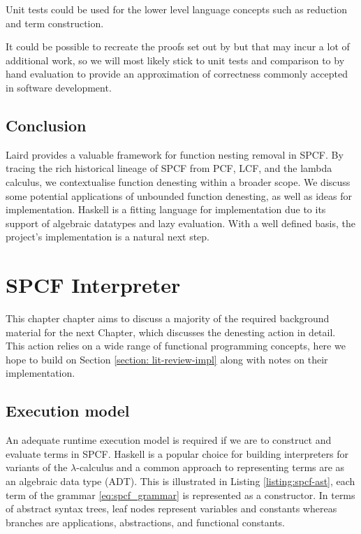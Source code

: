 \documentclass[12pt,a4paper]{report}
\theoremstyle{definition}
\theoremstyle{remark}
\begin{document}
Unit tests could be used for the lower level language concepts such as reduction and term construction.

It could be possible to recreate the proofs set out by \cite{laird_2007} but that may incur a lot of additional work, so we will most likely stick to unit tests and comparison to by hand evaluation to provide an approximation of correctness commonly accepted in software development.

\section{Conclusion}
Laird provides a valuable framework for function nesting removal in SPCF. By tracing the rich historical lineage of SPCF from PCF, LCF, and the lambda calculus, we contextualise function denesting within a broader scope. We discuss some potential applications of unbounded function denesting, as well as ideas for implementation. Haskell is a fitting language for implementation due to its support of algebraic datatypes and lazy evaluation. With a well defined basis, the project's implementation is a natural next step.

\chapter{SPCF Interpreter}\label{chapter: interpreter}
This chapter chapter aims to discuss a majority of the required background material for the next Chapter, which discusses the denesting action in detail. This action relies on a wide range of functional programming concepts, here we hope to build on Section \ref{section: lit-review-impl} along with notes on their implementation.

\section{Execution model}\label{section: language representation}
An adequate runtime execution model is required if we are to construct and evaluate terms in SPCF. Haskell is a popular choice for building interpreters for variants of the $\lambda$-calculus and a common approach to representing terms are as an algebraic data type (ADT). This is illustrated in Listing \ref{listing:spcf-ast}, each term of the grammar \eqref{eq:spcf_grammar} is represented as a constructor. In terms of abstract syntax trees, leaf nodes represent variables and constants whereas branches are applications, abstractions, and functional constants. 
\end{document}
